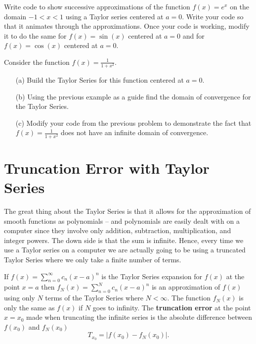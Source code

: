 \begin{problem}
    Write \ProgLang code to show successive approximations of the function $f(x) = e^x$ on
    the domain $-1 < x < 1$ using a Taylor series centered at $a=0$.  Write your code so
    that it animates through the approximations.  Once your code is working, modify it to
    do the same for $f(x) = \sin(x)$ centered at $a=0$ and for $f(x) = \cos(x)$ centered
    at $a=0$.
\end{problem}

\begin{problem}
    Consider the function $f(x) = \frac{1}{1+x^2}$.  
    \begin{enumerate}
        \item[(a)] Build the Taylor Series for this function centered at $a=0$.  
        \item[(b)] Using the previous example as a guide find the domain of convergence
            for the Taylor Series.
        \item[(c)] Modify your \ProgLang code from the previous problem to demonstrate the
            fact that $f(x) = \frac{1}{1+x^2}$ does not have an infinite domain of
            convergence.
    \end{enumerate}
\end{problem}


\section{Truncation Error with Taylor Series}
The great thing about the Taylor Series is that it allows for the
approximation of smooth functions as polynomials -- and polynomials are easily dealt with on
a computer since they involve only addition, subtraction, multiplication, and
integer powers. The down side is that the sum is infinite.  Hence, every time we use a Taylor
series on a computer we are actually going to be using a truncated Taylor Series where we
only take a finite number of terms.  

\begin{definition}
    If $f(x) = \sum_{n=0}^\infty c_n (x-a)^n$ is the Taylor Series expansion for $f(x)$ at
    the point $x=a$ then $f_N(x) = \sum_{n=0}^N c_n (x-a)^n$ is an approximation of $f(x)$
    using only $N$ terms of the Taylor Series where $N < \infty$.  The function $f_N(x)$
    is only the same as $f(x)$ if $N$ goes to infinity.  The {\bf truncation error} at the
    point $x=x_0$ made when truncating the infinite series is the absolute difference
    between $f(x_0)$ and $f_N(x_0)$
    \[ T_{x_0} = | f(x_0) - f_N(x_0)|. \]
\end{definition}

